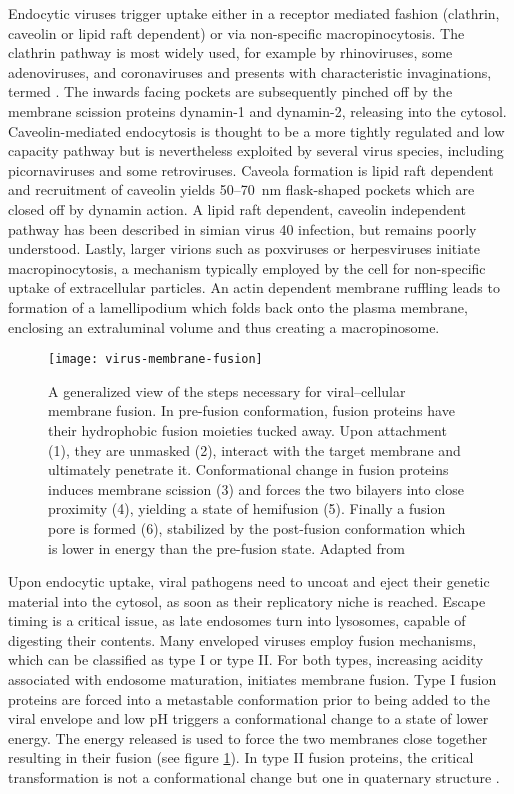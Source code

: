 Endocytic viruses trigger uptake either in a receptor mediated fashion (clathrin, caveolin or lipid raft dependent) or via non-specific macropinocytosis. The clathrin pathway is most widely used, for example by rhinoviruses, some adenoviruses, and coronaviruses and presents with characteristic invaginations, termed . The inwards facing pockets are subsequently pinched off by the membrane scission proteins dynamin-1 and dynamin-2, releasing  into the cytosol. Caveolin-mediated endocytosis is thought to be a more tightly regulated and low capacity pathway but is nevertheless exploited by several virus species, including picornaviruses and some retroviruses. Caveola formation is lipid raft dependent and recruitment of caveolin yields 50--\SI{70}{\nano\meter} flask-shaped pockets which are closed off by dynamin action. A lipid raft dependent, caveolin independent pathway has been described in simian virus 40 infection, but remains poorly understood. Lastly, larger virions such as poxviruses or herpesviruses initiate macropinocytosis, a mechanism typically employed by the cell for non-specific uptake of extracellular particles. An actin dependent membrane ruffling leads to formation of a lamellipodium which folds back onto the plasma membrane, enclosing an extraluminal volume and thus creating a macropinosome.

\begin{figure}
  \centering
  \texttt{[image: virus-membrane-fusion]}
  \caption[A generalized view of the steps necessary for viral--cellular membrane fusion]{A generalized view of the steps necessary for viral--cellular membrane fusion. In pre-fusion conformation, fusion proteins have their hydrophobic fusion moieties tucked away. Upon attachment (1), they are unmasked (2), interact with the target membrane and ultimately penetrate it. Conformational change in fusion proteins induces membrane scission (3) and forces the two bilayers into close proximity (4), yielding a state of hemifusion (5). Finally a fusion pore is formed (6), stabilized by the post-fusion conformation which is lower in energy than the pre-fusion state. Adapted from \citet{Hulo2011}}
  \label{fig:virus-membrane-fusion}
\end{figure}

Upon endocytic uptake, viral pathogens need to uncoat and eject their genetic material into the cytosol, as soon as their replicatory niche is reached. Escape timing is a critical issue, as late endosomes turn into lysosomes, capable of digesting their contents. Many enveloped viruses employ fusion mechanisms, which can be classified as type I or type II. For both types, increasing acidity associated with endosome maturation, initiates membrane fusion. Type I fusion proteins are forced into a metastable conformation prior to being added to the viral envelope and low pH triggers a conformational change to a state of lower energy. The energy released is used to force the two membranes close together resulting in their fusion (see figure \ref{fig:virus-membrane-fusion}). In type II fusion proteins, the critical transformation is not a conformational change but one in quaternary structure \citep{Harrison2008}.


